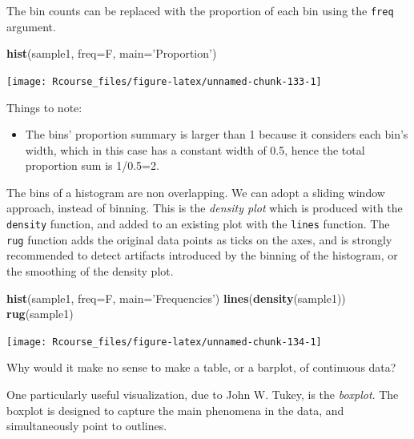 \documentclass[]{book}
\newenvironment{Shaded}{\begin{snugshade}}{\end{snugshade}}
\newcommand{\DataTypeTok}[1]{\textcolor[rgb]{0.13,0.29,0.53}{#1}}
\newcommand{\KeywordTok}[1]{\textcolor[rgb]{0.13,0.29,0.53}{\textbf{#1}}}
\newcommand{\NormalTok}[1]{#1}
\newcommand{\StringTok}[1]{\textcolor[rgb]{0.31,0.60,0.02}{#1}}
\providecommand{\tightlist}{%
  \setlength{\itemsep}{0pt}\setlength{\parskip}{0pt}}
\theoremstyle{definition}
\theoremstyle{definition}
\theoremstyle{definition}
\theoremstyle{remark}
\let\BeginKnitrBlock\begin \let\EndKnitrBlock\end
\begin{document}
The bin counts can be replaced with the proportion of each bin using the \texttt{freq} argument.

\begin{Shaded}
\begin{Highlighting}[]
\KeywordTok{hist}\NormalTok{(sample1, }\DataTypeTok{freq=}\NormalTok{F, }\DataTypeTok{main=}\StringTok{'Proportion'}\NormalTok{)    }
\end{Highlighting}
\end{Shaded}

\texttt{[image: Rcourse\_files/figure-latex/unnamed-chunk-133-1]}

Things to note:

\begin{itemize}
\tightlist
\item
  The bins' proportion summary is larger than 1 because it considers each bin's width, which in this case has a constant width of 0.5, hence the total proportion sum is 1/0.5=2.
\end{itemize}

The bins of a histogram are non overlapping.
We can adopt a sliding window approach, instead of binning.
This is the \emph{density plot} which is produced with the \texttt{density} function, and added to an existing plot with the \texttt{lines} function.
The \texttt{rug} function adds the original data points as ticks on the axes, and is strongly recommended to detect artifacts introduced by the binning of the histogram, or the smoothing of the density plot.

\begin{Shaded}
\begin{Highlighting}[]
\KeywordTok{hist}\NormalTok{(sample1, }\DataTypeTok{freq=}\NormalTok{F, }\DataTypeTok{main=}\StringTok{'Frequencies'}\NormalTok{)   }
\KeywordTok{lines}\NormalTok{(}\KeywordTok{density}\NormalTok{(sample1))                     }
\KeywordTok{rug}\NormalTok{(sample1)}
\end{Highlighting}
\end{Shaded}

\texttt{[image: Rcourse\_files/figure-latex/unnamed-chunk-134-1]}

\BeginKnitrBlock{remark}
{}Why would it make no sense to make a table, or a barplot, of continuous data?
\EndKnitrBlock{remark}

One particularly useful visualization, due to John W. Tukey, is the \emph{boxplot}.
The boxplot is designed to capture the main phenomena in the data, and simultaneously point to outlines.
\end{document}
